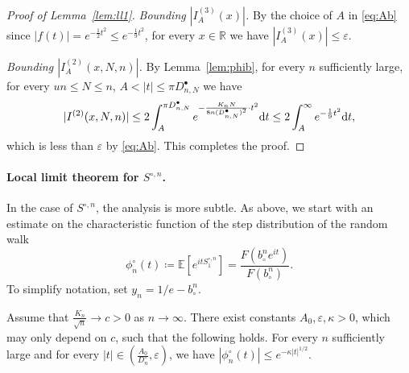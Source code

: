 \documentclass[10pt]{amsart}
\theoremstyle{definition}\newtheorem{defi}[theo]{Definition}\newtheorem{rema}[theo]{Remark}\newtheorem{exam}[theo]{Example}\newtheorem{exem}[theo]{Example}\newtheorem{nota}[theo]{Notation}
\newcommand{\R}{\mathbb{R}}
\def\d{{\rm d}}
\def\bcn{b_{\circ}^{n}}
\def\Scn{S^{\circ,n}}
\def\phicn{\phi^{\circ}_{n}}
\def\DbnN{D^{\bullet}_{n,N}}
\def\Dcn{D^{\circ}_{n}}
\renewcommand{\epsilon}{\varepsilon}
\newcommand\Es[1]{\mathbb{E}\left[#1\right]}
\begin{document}
\begin{proof}[Proof of Lemma~\ref{lem:ll1}]
\emph{Bounding $|I^{(3)}_{A}(x)|$.} By the choice of $A$ in \eqref{eq:Ab}
since $|f(t)|=e^{-  \frac{1}{2} t^{2}} \le e^{-  \frac{1}{9} t^{2}}$,
for every $x \in \R$ we have $|I^{(3)}_{A}(x)| \leq \epsilon$.


 \emph{Bounding $|I^{(2)}_{{A} }(x,N,n)|$.}  By Lemma~\ref{lem:phib},  for every $n$ sufficiently large, for every $ un \leq N \leq n$, $A<|t| \leq \pi  \DbnN$ we have
\[|I^{(2)}(x,N,n)| \leq 2 \int_{A}^{\pi \DbnN} e^{-  \frac{ K_{n} N }{ 8 n (\DbnN)^{2}} \cdot t^{2} } {\d}t \leq 2 \int_{A}^{\infty } e^{-  \frac{1}{9} t^{2}} {\d}t,\]
   which is less than $\epsilon$ by \eqref{eq:Ab}. This completes the proof.
\end{proof}





\paragraph*{Local limit theorem for $\Scn$.}

In the case of $\Scn$, the analysis is more subtle.
As above, we start with an estimate on the characteristic function
of the step distribution of the random walk
\[\phicn(t)\coloneqq\Es{e^{it\Scn_{1}}}=\frac{F( \bcn e^{it})}{F(\bcn)}.\]
To simplify notation, set  $y_{n}=1/e-\bcn$.

\begin{lemma}\label{lem:technique}
Assume that $\tfrac{K_{n}}{\sqrt{n}} \rightarrow c>0$ as $n \rightarrow \infty$.  There exist constants $A_{0},\epsilon,\kappa>0$, which may only depend on $c$, such that the following holds.
For every $n$ sufficiently large and for every $|t| \in (\frac{A_{0}}{\Dcn},\epsilon)$, we have $|\phicn(t)| \leq e^{- \kappa |t|^{1/2}}$.
\end{lemma}
\end{document}
